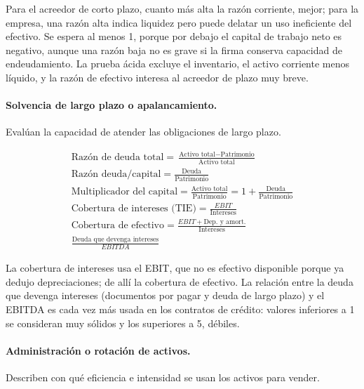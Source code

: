 Para el acreedor de corto plazo, cuanto más alta la razón corriente, mejor; para la empresa, una razón alta indica liquidez pero puede delatar un uso ineficiente del efectivo. Se espera al menos 1, porque por debajo el capital de trabajo neto es negativo, aunque una razón baja no es grave si la firma conserva capacidad de endeudamiento. La prueba ácida excluye el inventario, el activo corriente menos líquido, y la razón de efectivo interesa al acreedor de plazo muy breve.

\paragraph{Solvencia de largo plazo o apalancamiento.} Evalúan la capacidad de atender las obligaciones de largo plazo.

\begin{formulaBox}
\[
\begin{gathered}
\text{Razón de deuda total} = \frac{\text{Activo total}-\text{Patrimonio}}{\text{Activo total}}
\\[4pt]
\text{Razón deuda/capital} = \frac{\text{Deuda}}{\text{Patrimonio}}
\\[4pt]
\text{Multiplicador del capital} = \frac{\text{Activo total}}{\text{Patrimonio}} = 1+\frac{\text{Deuda}}{\text{Patrimonio}}
\\[4pt]
\text{Cobertura de intereses (TIE)} = \frac{EBIT}{\text{Intereses}}
\\[4pt]
\text{Cobertura de efectivo} = \frac{EBIT+\text{Dep. y amort.}}{\text{Intereses}}
\\[4pt]
\frac{\text{Deuda que devenga intereses}}{EBITDA}
\end{gathered}
\]
\end{formulaBox}

La cobertura de intereses usa el EBIT, que no es efectivo disponible porque ya dedujo depreciaciones; de allí la cobertura de efectivo. La relación entre la deuda que devenga intereses (documentos por pagar y deuda de largo plazo) y el EBITDA es cada vez más usada en los contratos de crédito: valores inferiores a 1 se consideran muy sólidos y los superiores a 5, débiles.

\paragraph{Administración o rotación de activos.} Describen con qué eficiencia e intensidad se usan los activos para vender.

